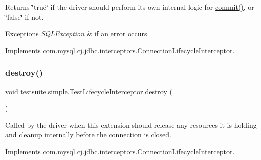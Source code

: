 \begin{DoxyReturn}{Returns}
\char`\"{}true\char`\"{} if the driver should perform its own internal logic for \mbox{\hyperlink{classtestsuite_1_1simple_1_1_test_lifecycle_interceptor_a1c51358948a855403a8953f3d4ba5590}{commit()}}, or \char`\"{}false\char`\"{} if not.
\end{DoxyReturn}

\begin{DoxyExceptions}{Exceptions}
{\em S\+Q\+L\+Exception} & if an error occurs \\
\hline
\end{DoxyExceptions}


Implements \mbox{\hyperlink{interfacecom_1_1mysql_1_1cj_1_1jdbc_1_1interceptors_1_1_connection_lifecycle_interceptor_a7415bbf8cf6eefbbbd22f710e7f694f9}{com.\+mysql.\+cj.\+jdbc.\+interceptors.\+Connection\+Lifecycle\+Interceptor}}.

\mbox{\label{classtestsuite_1_1simple_1_1_test_lifecycle_interceptor_a2a1a99507005bb6d901d3782880aac09}} 
\subsubsection{\texorpdfstring{destroy()}{destroy()}}
{\footnotesize\ttfamily void testsuite.\+simple.\+Test\+Lifecycle\+Interceptor.\+destroy (\begin{DoxyParamCaption}{ }\end{DoxyParamCaption})}

Called by the driver when this extension should release any resources it is holding and cleanup internally before the connection is closed. 

Implements \mbox{\hyperlink{interfacecom_1_1mysql_1_1cj_1_1jdbc_1_1interceptors_1_1_connection_lifecycle_interceptor_a33d706a19850fdc02c89b2e5f70cb2f5}{com.\+mysql.\+cj.\+jdbc.\+interceptors.\+Connection\+Lifecycle\+Interceptor}}.

\mbox{\label{classtestsuite_1_1simple_1_1_test_lifecycle_interceptor_ab7683af2eebc778cbf803ebc873c95ac}} 
